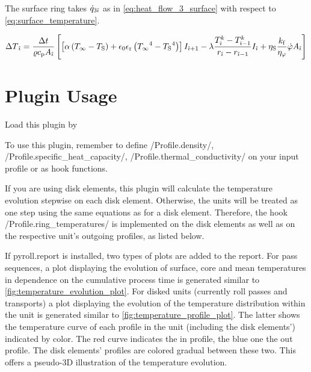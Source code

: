 \documentclass{PyRollDocs}
\begin{document}
    \noindent The surface ring takes ${\dot{q}}_{3{\hat{\imath}}}$ as in \autoref{eq:heat_flow_3_surface} with respect to \autoref{eq:surface_temperature}.

    \begin{equation}
        {\Delta T}_{\hat{\imath}} = \frac{{\Delta t}}{{\varrho}{c_\mathrm{p}}{A}_{\hat{\imath}}}
        \left[
            \left[ {\alpha} \left( {T_\infty} - {T_\mathrm{S}} \right) + {\epsilon_0}{\epsilon_\mathrm{r}}\left( {T_\infty}^4 - {T_\mathrm{S}}^4 \right) \right]
            {I}_{{\hat{\imath}}+1}
            -{\lambda} \frac{{T}_{{\hat{\imath}}}^{k} - {T}_{{\hat{\imath}}-1}^{k}}{{r}_{{\hat{\imath}}}-{r}_{{\hat{\imath}}-1}}
            {I}_{{\hat{\imath}}}
            + {\eta_\mathrm{S}} \frac{{k_\mathrm{f}}}{{\eta_\varphi}} {\dot{\varphi}} {A}_{{\hat{\imath}}}
            \right]
        \label{eq:increment_surface}
    \end{equation}


    \section{Plugin Usage}\label{sec:plugin-usage}

    Load this plugin by


    To use this plugin, remember to define \py/Profile.density/, \py/Profile.specific_heat_capacity/, \py/Profile.thermal_conductivity/ on your input profile or as hook functions.

    If you are using disk elements, this plugin will calculate the temperature evolution stepwise on each disk element.
    Otherwise, the units will be treated as one step using the same equations as for a disk element.
    Therefore, the hook \py/Profile.ring_temperatures/ is implemented on the disk elements as well as on the respective unit's outgoing profiles, as listed below.

    If {pyroll.report} is installed, two types of plots are added to the report.
    For pass sequences, a plot displaying the evolution of surface, core and mean temperatures in dependence on the cumulative process time is generated similar to \autoref{fig:temperature_evolution_plot}.
    For disked units (currently roll passes and transports) a plot displaying the evolution of the temperature distribution within the unit is generated similar to \autoref{fig:temperature_profile_plot}.
    The latter shows the temperature curve of each profile in the unit (including the disk elements') indicated by color.
    The red curve indicates the in profile, the blue one the out profile.
    The disk elements' profiles are colored gradual between these two.
    This offers a pseudo-3D illustration of the temperature evolution.
\end{document}

